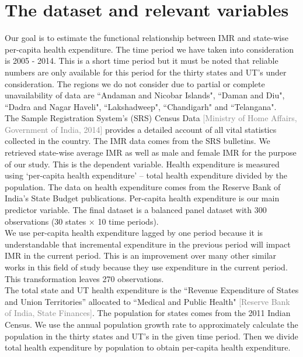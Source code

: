 \documentclass{article}
\begin{document}


\section{The dataset and relevant variables}
Our goal is to estimate the functional relationship between IMR and state-wise per-capita health expenditure.  The time period we have taken into consideration is 2005 - 2014. This is a short time period but it must be noted that reliable numbers are only available for this period for the thirty states and UT's under consideration. The regions we do not consider due to partial or complete unavailability of data are ``Andaman and Nicobar Islands", ``Daman and Diu", ``Dadra and Nagar Haveli", ``Lakshadweep", ``Chandigarh" and ``Telangana".\\
The Sample Registration System's (SRS) Census Data  \textcolor{gray}{[Ministry of Home Affairs, Government of India, 2014]} provides a detailed account of all vital statistics collected in the country. The IMR data comes from the SRS bulletins. We retrieved state-wise average IMR as well as male and female IMR for the purpose of our study. This is the dependent variable.  Health expenditure is measured using `per-capita health expenditure' -- total health expenditure divided by the population.  The data on health expenditure comes from the Reserve Bank of India's State Budget publications. Per-capita health expenditure is our main predictor variable. The final dataset is a balanced panel dataset with 300 observations (30 states $\times$ 10 time periods).\\
 We use per-capita health expenditure lagged by one period because it is understandable that incremental expenditure in the previous period will impact IMR in the current period. This is an improvement over many other similar works in this field of study because they use expenditure in the current period. This transformation leaves 270 observations.\\
The total state and UT health expenditure is the ``Revenue Expenditure of States and Union Territories'' allocated to ``Medical and Public Health"  \textcolor{gray}{[Reserve Bank of India, State Finances]}. The population for states comes from the 2011 Indian Census. We use the annual population growth rate to approximately calculate the population in the thirty states and UT's in the given time period. Then we divide total health expenditure by population to obtain per-capita health expenditure.\\
\end{document}
